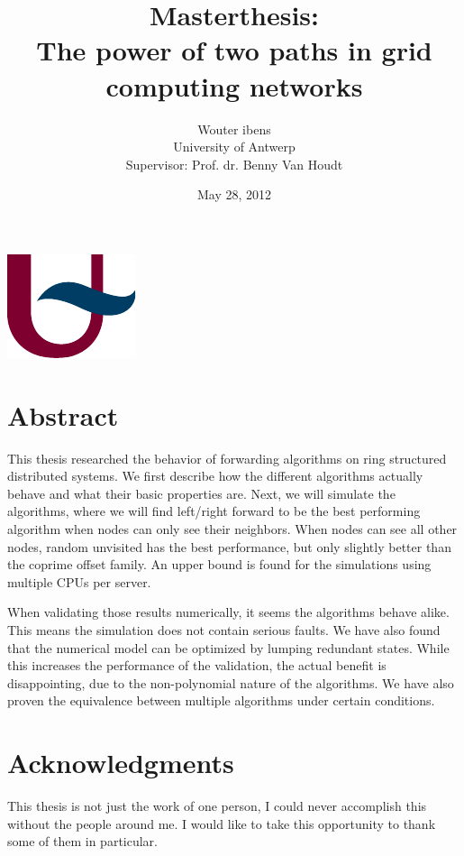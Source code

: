 \documentclass[10pt,a4paper]{article}
\author{Wouter ibens \\ University of Antwerp \\ Supervisor: Prof. dr. Benny Van Houdt}
\title{Masterthesis: \\ The power of two paths in grid computing networks}
\date{May 28, 2012}
\begin{document}
\vspace{8em}
\maketitle
\thispagestyle{empty}
\vspace{32em}
\begin{center}
\includegraphics[scale=1.0]{resources/ua.pdf}
\end{center}
\newpage

\section*{Abstract}
This thesis researched the behavior of forwarding algorithms on ring structured distributed systems. We first describe how the different algorithms actually behave and what their basic properties are. Next, we will simulate the algorithms, where we will find left/right forward to be the best performing algorithm when nodes can only see their neighbors. When nodes can see all other nodes, random unvisited has the best performance, but only slightly better than the coprime offset family. An upper bound is found for the simulations using multiple CPUs per server.

When validating those results numerically, it seems the algorithms behave alike. This means the simulation does not contain serious faults. We have also found that the numerical model can be optimized by lumping redundant states. While this increases the performance of the validation, the actual benefit is disappointing, due to the non-polynomial nature of the algorithms. We have also proven the equivalence between multiple algorithms under certain conditions.

\newpage

\section*{Acknowledgments}
This thesis is not just the work of one person, I could never accomplish this without the people around me. I would like to take this opportunity to thank some of them in particular.
\end{document}

